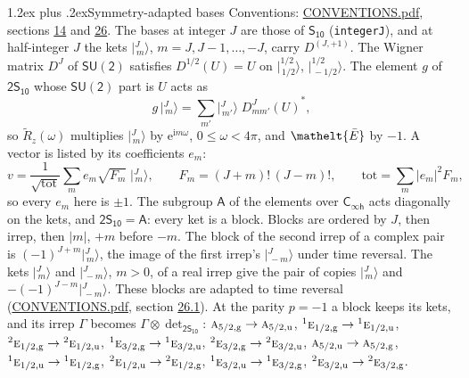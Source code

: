 \documentclass[10pt,a4paper]{article}
\makeatletter
\renewcommand\section{\@startsection{section}{1}{\z@}{-3ex plus -1ex minus -.2ex}%
  {1.2ex plus .2ex}{\normalfont\large\sffamily\bfseries\color{parttitle}}}
\numberwithin{equation}{section}
\newcommand{\eltfont}[1]{{\let\sigma\eltsigma\mathelt{#1}}}
\newcommand{\grp}[1]{\mathsf{#1}}
\newcommand{\irr}[1]{\text{\normalfont\scshape #1}}
\newcommand{\conjpair}[1]{{}^{#1}}
\newcommand{\elt}[1]{\eltfont{#1}}
\newcommand{\ptag}[1]{\mathrm{#1}}
\newcommand{\iunit}{\mathrm{i}}
\newcommand{\expe}{\mathrm{e}}
\newcommand{\irrJp}[2]{D^{(#1,#2)}}
\newcommand{\wignerD}[1]{D^{#1}}
\newcommand{\conj}[1]{{#1}^{*}}
\newcommand{\irrprod}{\otimes}
\newcommand{\jm}[2]{\bigl\lvert{}^{#1}_{\,#2}\bigr\rangle}
\newcommand{\barred}[1]{\bar{#1}}
\newcommand{\lift}[1]{\tilde{#1}}
\makeatother
\begin{document}
\section{Symmetry-adapted bases}\label{s:bases}
Conventions: \href{../../CONVENTIONS.pdf}{CONVENTIONS.pdf}, sections \href{../../../rotation/CONVENTIONS.pdf\#conv.14}{14} and \href{../../CONVENTIONS.pdf\#conv.26}{26}.
\leavevmode\label{n:index.m}\label{n:vector.ket}The bases at integer $J$ are those of \href{../../../rotation/data/pdf/S10.pdf}{$\grp{S_{10}}$} (\texttt{integerJ}), and at half-integer $J$ the kets $\jm{J}{m}$, $m = J, J-1, \dots, -J$, carry $\irrJp{J}{+1}$. \label{n:matrix.wigner}The Wigner matrix $\wignerD{J}$ of $\grp{SU(2)}$ satisfies $\wignerD{1/2}(U) = U$ on $\jm{1/2}{1/2}$, $\jm{1/2}{-1/2}$. The element $g$ of $\grp{2S_{10}}$ whose $\grp{SU(2)}$ part is $U$ acts as
\begin{equation}\label{e:action}g\,\jm{J}{m} = \sum_{m'} \jm{J}{m'}\; \conj{\wignerD{J}_{m m'}(U)},\end{equation}
so $\lift{R}_{z}(\omega)$ multiplies $\jm{J}{m}$ by $\expe^{\iunit m\omega}$, $0 \le \omega < 4\pi$, and $\elt{\barred{E}}$ by $-1$. \label{n:index.ketcoefficient}\label{n:vector.basis.symmetry}\label{n:index.ketweight}\label{n:index.total}A vector is listed by its coefficients $e_m$:
\begin{equation}\label{e:ket}v = \frac{1}{\sqrt{\mathrm{tot}}}\sum_m e_m\sqrt{F_m}\;\jm{J}{m},\qquad F_m = (J+m)!\,(J-m)!,\qquad \mathrm{tot} = \sum_m |e_m|^2F_m,\end{equation}
so every $e_m$ here is $\pm 1$.
\leavevmode\label{n:group.A}The subgroup $\grp{A}$ of the elements over $\grp{C_{\infty h}}$ acts diagonally on the kets, and $\grp{2S_{10}} = \grp{A}$: every ket is a block. Blocks are ordered by $J$, then irrep, then $|m|$, $+m$ before $-m$. The block of the second irrep of a complex pair is $(-1)^{J+m}\jm{J}{m}$, the image of the first irrep's $\jm{J}{-m}$ under time reversal. The kets $\jm{J}{m}$ and $\jm{J}{-m}$, $m > 0$, of a real irrep give the pair of copies $\jm{J}{m}$ and $-(-1)^{J-m}\jm{J}{-m}$. These blocks are adapted to time reversal (\href{../../CONVENTIONS.pdf}{CONVENTIONS.pdf}, section \href{../../CONVENTIONS.pdf\#conv.26.1}{26.1}).
At the parity $p = -1$ a block keeps its kets, and its irrep $\Gamma$ becomes $\Gamma \irrprod \det_{\grp{2S_{10}}}$: $\irr{a}_{5/2,\ptag{g}} \to \irr{a}_{5/2,\ptag{u}}$, $\conjpair{1}\irr{e}_{1/2,\ptag{g}} \to \conjpair{1}\irr{e}_{1/2,\ptag{u}}$, $\conjpair{2}\irr{e}_{1/2,\ptag{g}} \to \conjpair{2}\irr{e}_{1/2,\ptag{u}}$, $\conjpair{1}\irr{e}_{3/2,\ptag{g}} \to \conjpair{1}\irr{e}_{3/2,\ptag{u}}$, $\conjpair{2}\irr{e}_{3/2,\ptag{g}} \to \conjpair{2}\irr{e}_{3/2,\ptag{u}}$, $\irr{a}_{5/2,\ptag{u}} \to \irr{a}_{5/2,\ptag{g}}$, $\conjpair{1}\irr{e}_{1/2,\ptag{u}} \to \conjpair{1}\irr{e}_{1/2,\ptag{g}}$, $\conjpair{2}\irr{e}_{1/2,\ptag{u}} \to \conjpair{2}\irr{e}_{1/2,\ptag{g}}$, $\conjpair{1}\irr{e}_{3/2,\ptag{u}} \to \conjpair{1}\irr{e}_{3/2,\ptag{g}}$, $\conjpair{2}\irr{e}_{3/2,\ptag{u}} \to \conjpair{2}\irr{e}_{3/2,\ptag{g}}$.
\end{document}
